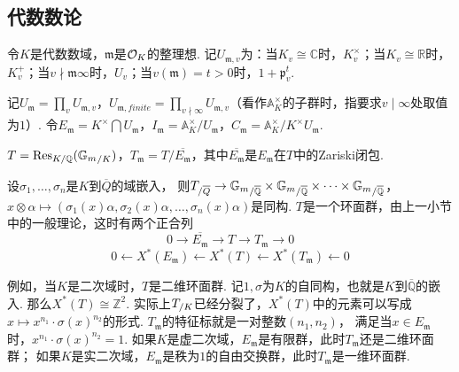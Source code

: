 

\subsection{代数数论}

令$K$是代数数域，$\mathfrak{m}$是$\mathcal{O}_K$的整理想. 记$U_{\mathfrak{m}, v}$为：当$K_v \cong \mathbb{C}$时，$K_v^{\times}$；当$K_v\cong \mathbb{R}$时，$K_v^{+}$；当$v\nmid\mathfrak{m}\infty$时，$U_{v}$；当$v(\mathfrak{m})=t>0$时，$1+\mathfrak{p}_v^{t}$. 

记$U_{\mathfrak{m}}=\prod_v U_{\mathfrak{m}, v}$，$U_{\mathfrak{m}, finite} = \prod_{v\nmid \infty}U_{\mathfrak{m}, v}$（看作$\mathbb{A}_K^{\times}$的子群时，指要求$v\mid \infty$处取值为$1$）.
令$E_{\mathfrak{m}} = K^{\times} \bigcap U_{\mathfrak{m}}$，$I_{\mathfrak{m}} = \mathbb{A}_K^{\times}/U_{\mathfrak{m}}$，$C_{\mathfrak{m}} = \mathbb{A}_K^{\times} / K^{\times}U_{\mathfrak{m}}$.

$T = \mathrm{Res}_{K/\mathbb{Q}}({\mathbb{G}_m}_{/K})$，$T_{\mathfrak{m}} = T / \overline{E_{\mathfrak{m}}}$，其中$\overline{E_{\mathfrak{m}}}$是$E_{\mathfrak{m}}$在$T$中的Zariski闭包.

设$\sigma_1,\ldots,\sigma_n$是$K$到$\overline{Q}$的域嵌入，
则${T}_{/\overline{Q}}\to {\mathbb{G}_m}_{/\overline{\mathbb{Q}}}\times {\mathbb{G}_m}_{/\overline{\mathbb{Q}}} \times \cdots \times {\mathbb{G}_m}_{/\overline{\mathbb{Q}}}$，$x\otimes \alpha \mapsto (\sigma_1(x)\alpha, \sigma_2(x)\alpha, \ldots,\sigma_n(x)\alpha)$是同构.
$T$是一个环面群，由上一小节中的一般理论，这时有两个正合列
\begin{equation}
    0 \rightarrow \overline{E_{\mathfrak{m}}} \rightarrow T \rightarrow T_{\mathfrak{m}}\rightarrow 0
\end{equation}
\begin{equation}
    0 \leftarrow X^{*}(E_{\mathfrak{m}}) \leftarrow X^{*}(T) \leftarrow X^{*}(T_{\mathfrak{m}}) \leftarrow 0
\end{equation}

例如，当$K$是二次域时，$T$是二维环面群. 记$1,\sigma$为$K$的自同构，也就是$K$到$\overline{\mathbb{Q}}$的嵌入.
那么$X^{*}(T)\cong \mathbb{Z}^2$.
实际上${T}_{/K}$已经分裂了，$X^{*}(T)$中的元素可以写成$x\mapsto x^{n_1}\cdot \sigma(x)^{n_2}$的形式.
$T_{\mathfrak{m}}$的特征标就是一对整数$(n_1,n_2)$，
满足当$x\in E_{\mathfrak{m}}$时，$x^{n_1}\cdot \sigma(x)^{n_2}=1$.
如果$K$是虚二次域，$E_{\mathfrak{m}}$是有限群，此时$T_{\mathfrak{m}}$还是二维环面群；
如果$K$是实二次域，$E_{\mathfrak{m}}$是秩为$1$的自由交换群，此时$T_{\mathfrak{m}}$是一维环面群.


